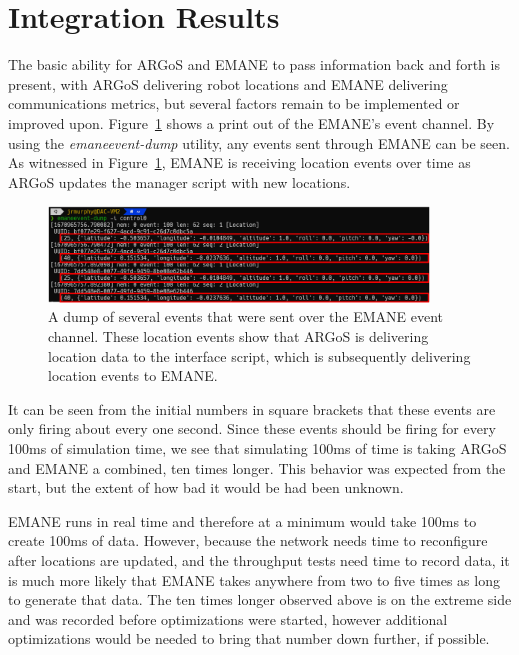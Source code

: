 \section{Integration Results}
The basic ability for ARGoS and EMANE to pass information back and forth is present, with ARGoS delivering robot locations and EMANE delivering communications metrics, but several factors remain to be implemented or improved upon.
Figure~\ref{emane_locs} shows a print out of the EMANE's event channel.
By using the \textit{emaneevent-dump} utility, any events sent through EMANE can be seen.
As witnessed in Figure~\ref{emane_locs}, EMANE is receiving location events over time as ARGoS updates the manager script with new locations.
\begin{figure}[!ht]
    \centering
    \includegraphics[width=0.9\textwidth,keepaspectratio]{Images/Chpt5/ARGoS_Events_EMANE_annotated.png}
    \caption{A dump of several events that were sent over the EMANE event channel. These location events show that ARGoS is delivering location data to the interface script, which is subsequently delivering location events to EMANE.}
    \label{emane_locs}
\end{figure}
It can be seen from the initial numbers in square brackets that these events are only firing about every one second.
Since these events should be firing for every 100ms of simulation time, we see that simulating 100ms of time is taking ARGoS and EMANE a combined, ten times longer.
This behavior was expected from the start, but the extent of how bad it would be had been unknown.\par
EMANE runs in real time and therefore at a minimum would take 100ms to create 100ms of data.
However, because the network needs time to reconfigure after locations are updated, and the throughput tests need time to record data, it is much more likely that EMANE takes anywhere from two to five times as long to generate that data.
The ten times longer observed above is on the extreme side and was recorded before optimizations were started, however additional optimizations would be needed to bring that number down further, if possible.
